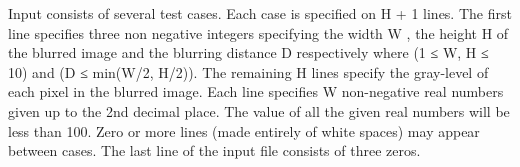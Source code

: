Input consists of several test cases. Each case is specified on H + 1 lines. The first line specifies three non negative integers specifying the width W , the height H of the blurred image and the blurring distance D respectively where (1 ≤ W, H ≤ 10) and (D ≤ min(W/2, H/2)). The remaining H lines specify the gray-level of each pixel in the blurred image. Each line specifies W non-negative real numbers given up to the 2nd decimal place. The value of all the given real numbers will be less than 100. Zero or more lines (made entirely of white spaces) may appear between cases. The last line of the input file consists of three zeros.  

\
